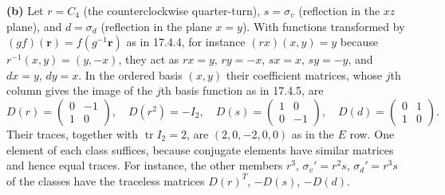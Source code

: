 \textbf{(b)} Let $r=C_4$ (the counterclockwise quarter-turn),
$s=\sigma_v$ (reflection in the $xz$ plane), and $d=\sigma_d$
(reflection in the plane $x=y$). With functions transformed by
$(gf)(\mathbf r)=f(g^{-1}\mathbf r)$ as in 17.4.4, for instance
$(rx)(x,y)=y$ because $r^{-1}(x,y)=(y,-x)$, they act as
$r x=y$, $r y=-x$,
$s x=x$, $s y=-y$, and $d x=y$, $d y=x$.
In the ordered basis $(x,y)$ their coefficient matrices, whose $j$th
column gives the image of the $j$th basis function as in 17.4.5, are
\[
D(r)=\begin{pmatrix}0&-1\\1&0\end{pmatrix},\quad
D(r^2)=-I_2,\quad
D(s)=\begin{pmatrix}1&0\\0&-1\end{pmatrix},\quad
D(d)=\begin{pmatrix}0&1\\1&0\end{pmatrix}.
\]
Their traces, together with $\operatorname{tr}I_2=2$, are
$(2,0,-2,0,0)$ as in the $E$ row.
One element of each class suffices, because conjugate elements have
similar matrices and hence equal traces. For instance, the other
members $r^3$, $\sigma_v'=r^2s$, $\sigma_d'=r^3s$ of the classes
have the traceless matrices $D(r)^T$, $-D(s)$, $-D(d)$.

